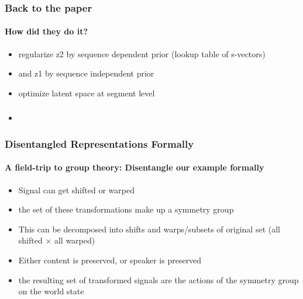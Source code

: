 \documentclass[9pt]{beamer}
\begin{document}
\begin{frame}
\frametitle{Back to the paper}
\framesubtitle{How did they do it?}
\begin{itemize}
	\item regularize z2 by sequence dependent prior (lookup table of s-vectors)
	\item and z1 by sequence independent prior 
	\item optimize latent space at segment level
\end{itemize}
\end{frame} 



\begin{frame}
\frametitle{}
\framesubtitle{}
\begin{itemize}
	\item 
\end{itemize}
\end{frame} 


\begin{frame}
\frametitle{Disentangled Representations Formally}
\framesubtitle{A field-trip to group theory: Disentangle our example formally}
\begin{itemize}%
	\item Signal can get shifted or warped
	\item the set of these transformations make up a symmetry group
	\item This can be decomposed into shifts and warps/subsets of original set (all shifted $\times$ all warped)
	\item Either content is preserved, or speaker is preserved
	\item the resulting set of transformed signals are the actions of the symmetry group on the world state
\end{itemize}
\end{frame} 
\end{document}
